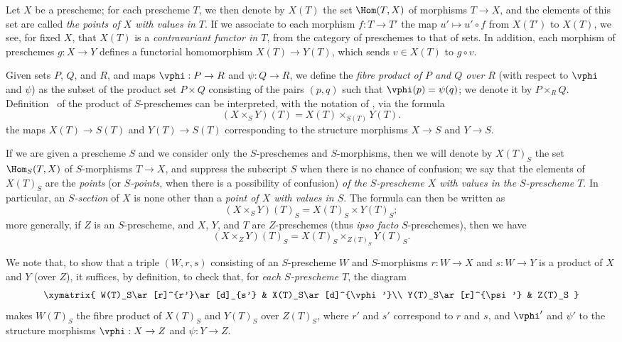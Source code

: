 \begin{env}[3.4.1]
\label{I.3.4.1}
Let $X$ be a prescheme; for each prescheme $T$, we then denote by $X(T)$ the set
$\Hom(T,X)$ of morphisms $T\to X$, and the elements of this set are called
\emph{the points of $X$ with values in $T$}. If we associate to each morphism
$f:T\to T'$ the map $u'\mapsto u'\circ f$ from $X(T')$ to $X(T)$, we see,
for fixed $X$, that $X(T)$ is a \emph{contravariant functor in $T$}, from the
category of preschemes to that of sets. In addition, each morphism of preschemes
$g:X\to Y$ defines a functorial homomorphism $X(T)\to Y(T)$, which sends
$v\in X(T)$ to $g\circ v$.
\end{env}

\begin{env}[3.4.2]
\label{I.3.4.2}
Given sets $P$, $Q$, and $R$, and maps $\vphi:P\to R$ and $\psi:Q\to R$, we define the
\emph{fibre product of $P$ and $Q$ over $R$} (with respect to $\vphi$ and $\psi$) as the subset
of
the product set $P\times Q$ consisting of the pairs $(p,q)$ such that $\vphi(p)=\psi(q)$; we
denote it by $P\times_R Q$. Definition~ of the product
of $S$-preschemes can be interpreted, with the notation of ,
via the formula
\[
\label{I.3.4.2.1}
  (X\times_S Y)(T)=X(T)\times_{S(T)}Y(T).
  \tag{3.4.2.1}
\]
the maps $X(T)\to S(T)$ and $Y(T)\to S(T)$ corresponding to the structure morphisms
$X\to S$ and $Y\to S$.
\end{env}

\begin{env}[3.4.3]
\label{I.3.4.3}
If we are given a prescheme $S$ and we consider only the $S$-preschemes and $S$-morphisms,
then we will denote by $X(T)_S$ the set $\Hom_S(T,X)$ of $S$-morphisms $T\to X$, and suppress
the subscript $S$ when there is no chance of confusion; we say that the elements of $X(T)_S$
are the \emph{points} (or \emph{$S$-points}, when there is a possibility of confusion)
\emph{of the $S$-prescheme $X$ with values in the $S$-prescheme $T$}. In particular, an
\emph{$S$-section} of $X$ is none other than a \emph{point of $X$ with values in $S$}. The
formula  can then be written as
\[
\label{I.3.4.3.1}
  (X\times_S Y)(T)_S=X(T)_S\times Y(T)_S;
  \tag{3.4.3.1}
\]
more generally, if $Z$ is an $S$-prescheme, and $X$, $Y$, and $T$ are $Z$-preschemes (thus
\emph{ipso facto} $S$-preschemes), then we have
\[
\label{I.3.4.3.2}
  (X\times_Z Y)(T)_S=X(T)_S\times_{Z(T)_S}Y(T)_S.
  \tag{3.4.3.2}
\]

We note that, to show that a triple $(W,r,s)$ consisting of an $S$-prescheme $W$ and
$S$-morphisms $r:W\to X$ and $s:W\to Y$ is a product of $X$ and $Y$ (over $Z$), it suffices, by
definition, to check that, for \emph{each $S$-prescheme $T$}, the diagram
\[
  \xymatrix{
    W(T)_S\ar[r]^{r'}\ar[d]_{s'} &
    X(T)_S\ar[d]^{\vphi'}\\
    Y(T)_S\ar[r]^{\psi'} &
    Z(T)_S
  }
\]
makes $W(T)_S$ the fibre product of $X(T)_S$ and $Y(T)_S$ over $Z(T)_S$, where $r'$ and $s'$
correspond to $r$ and $s$, and $\vphi'$ and $\psi'$ to the structure morphisms $\vphi:X\to Z$ and $\psi:Y\to Z$.
\end{env}

